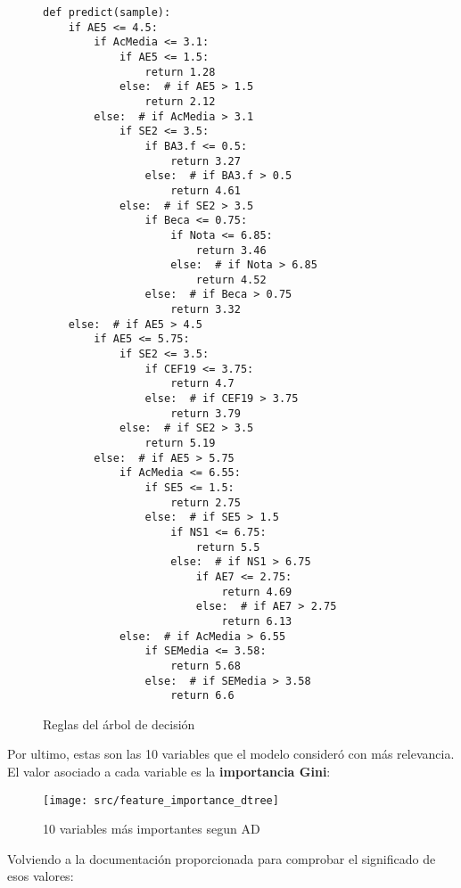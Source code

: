 \begin{figure}[H]
	\begin{lstlisting}
def predict(sample):
	if AE5 <= 4.5:
		if AcMedia <= 3.1:
			if AE5 <= 1.5:
				return 1.28
			else:  # if AE5 > 1.5
				return 2.12
		else:  # if AcMedia > 3.1
			if SE2 <= 3.5:
				if BA3.f <= 0.5:
					return 3.27
				else:  # if BA3.f > 0.5
					return 4.61
			else:  # if SE2 > 3.5
				if Beca <= 0.75:
					if Nota <= 6.85:
						return 3.46
					else:  # if Nota > 6.85
						return 4.52
				else:  # if Beca > 0.75
					return 3.32
	else:  # if AE5 > 4.5
		if AE5 <= 5.75:
			if SE2 <= 3.5:
				if CEF19 <= 3.75:
					return 4.7
				else:  # if CEF19 > 3.75
					return 3.79
			else:  # if SE2 > 3.5
				return 5.19
		else:  # if AE5 > 5.75
			if AcMedia <= 6.55:
				if SE5 <= 1.5:
					return 2.75
				else:  # if SE5 > 1.5
					if NS1 <= 6.75:
						return 5.5
					else:  # if NS1 > 6.75
						if AE7 <= 2.75:
							return 4.69
						else:  # if AE7 > 2.75
							return 6.13
			else:  # if AcMedia > 6.55
				if SEMedia <= 3.58:
					return 5.68
				else:  # if SEMedia > 3.58
					return 6.6
	\end{lstlisting}
\caption{Reglas del árbol de decisión}
\label{fig:tree_rules}
\end{figure}
\pagebreak
Por ultimo, estas son las 10 variables que el modelo consideró con más relevancia. El valor asociado a cada variable es la \textbf{importancia Gini}:
\begin{figure}[H]
	\centering
	\texttt{[image: src/feature\_importance\_dtree]}
	\caption{10 variables más importantes segun AD}
	\label{fig:feature_dtree}
\end{figure}
Volviendo a la documentación proporcionada para comprobar el significado de esos valores:
